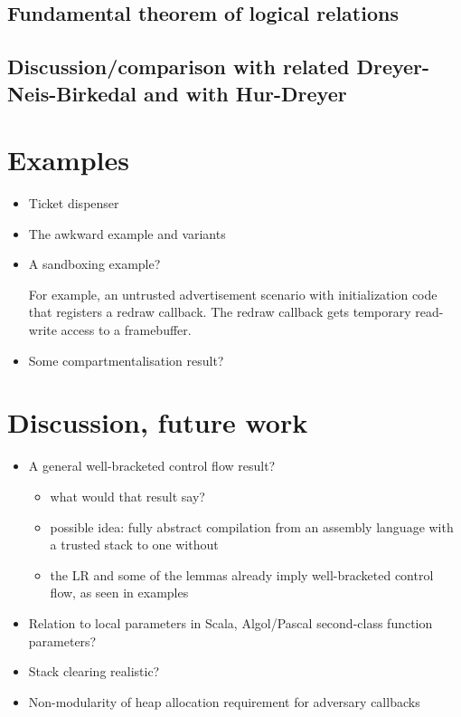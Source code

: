 \documentclass[compsoc,conference,letterpaper,fleqn]{IEEEtran}
\begin{document}
\subsection{Fundamental theorem of logical relations}

\subsection{Discussion/comparison with related Dreyer-Neis-Birkedal and with Hur-Dreyer}


\section{Examples}
\begin{itemize}
\item Ticket dispenser
\item The awkward example and variants
\item A sandboxing example?

For example, an untrusted advertisement scenario with initialization code
that registers a redraw callback. The redraw callback gets temporary
read-write access to a framebuffer.

\item Some compartmentalisation result?
\end{itemize}

\section{Discussion, future work}
\begin{itemize}
\item A general well-bracketed control flow result?
\begin{itemize}
\item what would that result say?
\item possible idea: fully abstract compilation from an assembly language with
a trusted stack to one without
\item the LR and some of the lemmas already imply well-bracketed control flow, as seen in examples
\end{itemize}
\item Relation to local parameters in Scala, Algol/Pascal second-class function parameters?
\item Stack clearing realistic?
\item Non-modularity of heap allocation requirement for adversary callbacks
\end{itemize}
\end{document}
